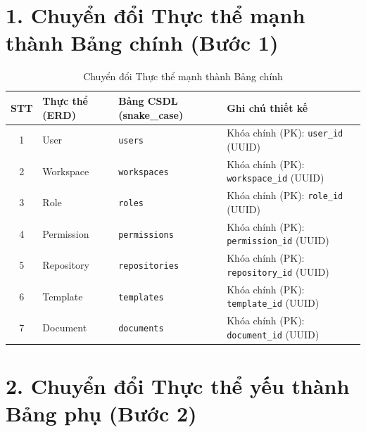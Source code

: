 \section*{1. Chuyển đổi Thực thể mạnh thành Bảng chính (Bước 1)}

\begin{longtable}{|c|p{3cm}|p{3.5cm}|p{5.5cm}|}
\caption{Chuyển đổi Thực thể mạnh thành Bảng chính} \\
\hline
\textbf{STT} & \textbf{Thực thể (ERD)} & \textbf{Bảng CSDL (snake\_case)} & \textbf{Ghi chú thiết kế} \\ \hline
\endhead

1 & User & \texttt{users} & Khóa chính (PK): \texttt{user\_id} (UUID) \\ \hline
2 & Workspace & \texttt{workspaces} & Khóa chính (PK): \texttt{workspace\_id} (UUID) \\ \hline
3 & Role & \texttt{roles} & Khóa chính (PK): \texttt{role\_id} (UUID) \\ \hline
4 & Permission & \texttt{permissions} & Khóa chính (PK): \texttt{permission\_id} (UUID) \\ \hline
5 & Repository & \texttt{repositories} & Khóa chính (PK): \texttt{repository\_id} (UUID) \\ \hline
6 & Template & \texttt{templates} & Khóa chính (PK): \texttt{template\_id} (UUID) \\ \hline
7 & Document & \texttt{documents} & Khóa chính (PK): \texttt{document\_id} (UUID) \\ \hline
\end{longtable}

\section*{2. Chuyển đổi Thực thể yếu thành Bảng phụ (Bước 2)}

